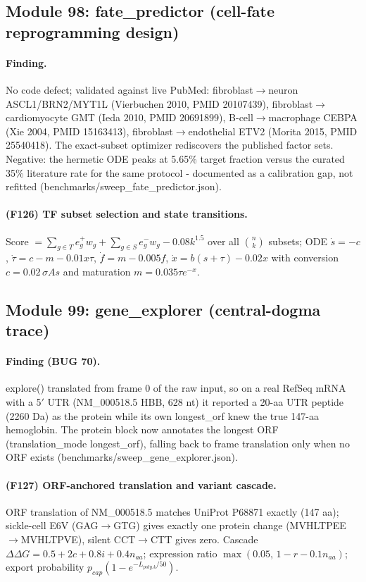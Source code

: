 \subsection{Module 98: fate\_predictor (cell-fate reprogramming design)}
\paragraph{Finding.} No code defect; validated against live PubMed: fibroblast$\to$neuron ASCL1/BRN2/MYT1L (Vierbuchen 2010, PMID 20107439), fibroblast$\to$cardiomyocyte GMT (Ieda 2010, PMID 20691899), B-cell$\to$macrophage CEBPA (Xie 2004, PMID 15163413), fibroblast$\to$endothelial ETV2 (Morita 2015, PMID 25540418). The exact-subset optimizer rediscovers the published factor sets. Negative: the hermetic ODE peaks at 5.65\% target fraction versus the curated 35\% literature rate for the same protocol - documented as a calibration gap, not refitted (benchmarks/sweep\_fate\_predictor.json).
\paragraph{(F126) TF subset selection and state transitions.} Score $=\sum_{g\in T}e_g^+w_g+\sum_{g\in S}e_g^-w_g-0.08k^{1.5}$ over all $\binom{n}{k}$ subsets; ODE $\dot s=-c$, $\dot\tau=c-m-0.01x\tau$, $\dot f=m-0.005f$, $\dot x=b(s+\tau)-0.02x$ with conversion $c=0.02\,\sigma A s$ and maturation $m=0.035\tau e^{-x}$.
\subsection{Module 99: gene\_explorer (central-dogma trace)}
\paragraph{Finding (BUG 70).} explore() translated from frame 0 of the raw input, so on a real RefSeq mRNA with a 5$'$ UTR (NM\_000518.5 HBB, 628 nt) it reported a 20-aa UTR peptide (2260 Da) as the protein while its own longest\_orf knew the true 147-aa hemoglobin. The protein block now annotates the longest ORF (translation\_mode longest\_orf), falling back to frame translation only when no ORF exists (benchmarks/sweep\_gene\_explorer.json).
\paragraph{(F127) ORF-anchored translation and variant cascade.} ORF translation of NM\_000518.5 matches UniProt P68871 exactly (147 aa); sickle-cell E6V (GAG$\to$GTG) gives exactly one protein change (MVHLTPEE$\to$MVHLTPVE), silent CCT$\to$CTT gives zero. Cascade $\Delta\Delta G=0.5+2c+0.8i+0.4n_{aa}$; expression ratio $\max(0.05,\,1-r-0.1n_{aa})$; export probability $p_{cap}(1-e^{-L_{polyA}/50})$.
